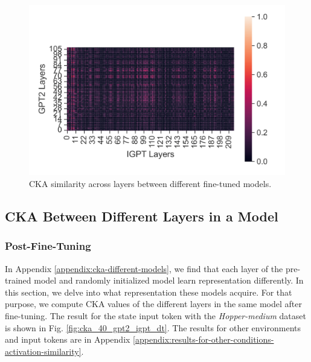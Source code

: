 \documentclass{article}
\begin{document}
\begin{figure}[h]
\begin{minipage}[b]{0.32\linewidth}
    \end{minipage}
    \begin{minipage}[b]{0.32\linewidth}
        \includegraphics[width=\linewidth]{figs/cka_40_40_gpt2igpt_hopper_medium_666_state.png}
    \end{minipage}
    \caption{CKA similarity across layers between different fine-tuned models.}
    \label{fig:cka_gpt2_dt_igpt}
\end{figure}

\subsection{CKA Between Different Layers in a Model}
\subsubsection{Post-Fine-Tuning}
In Appendix \ref{appendix:cka-different-models}, we find that each layer of the pre-trained model and randomly initialized model learn representation differently. In this section, we delve into what representation these models acquire. For that purpose, we compute CKA values of the different layers in the same model after fine-tuning. The result for the state input token with the \textit{Hopper-medium} dataset is shown in Fig. \ref{fig:cka_40_gpt2_igpt_dt}. The results for other environments and input tokens are in Appendix \ref{appendix:results-for-other-conditions-activation-similarity}.
\end{document}
